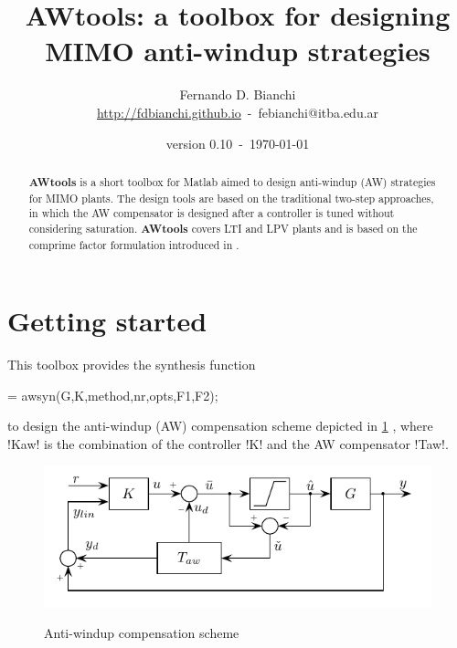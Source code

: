 \documentclass[fleqn,11pt]{article}
\makeatletter
\newcommand{\ver}{version 0.10\xspace}
\newcommand{\auth}{Fernando D. Bianchi}
\newcommand{\email}{febianchi@itba.edu.ar}
\newcommand{\web}{http://fdbianchi.github.io}
\newcommand{\weblink}[1]{\url{#1}}
\newcommand{\awtool}{\textbf{AWtools}\xspace}
\makeatother
\begin{document}
\title{\awtool: a toolbox for designing MIMO anti-windup strategies}
\author{\auth\\\weblink{\web}~-~\email}
\date{\ver~-~\mydate\today}
%
\maketitle{}

\begin{abstract}
    \awtool is a short toolbox for Matlab aimed to design anti-windup (AW) strategies for MIMO plants. The design tools are based on the traditional two-step approaches, in which the AW compensator is designed after a controller is tuned without considering saturation. \awtool covers LTI and LPV plants and is based on the comprime factor formulation introduced in \cite{Turner2004,Skogestad2005}.
\end{abstract}

\section{Getting started}\label{sec:gt}

This toolbox provides the synthesis function
\begin{code}
 = awsyn(G,K,method,nr,opts,F1,F2);
\end{code}
to design the anti-windup (AW) compensation scheme depicted in \cref{fig:AW1} \citep{Turner2004}, where !Kaw! is the combination of the controller !K! and the AW compensator !Taw!.

\begin{figure}
    \centering
    \includegraphics{figs/fig_sch_AWcomp_1}\\
    \caption{Anti-windup compensation scheme}\label{fig:AW1}
\end{figure}
\end{document}
